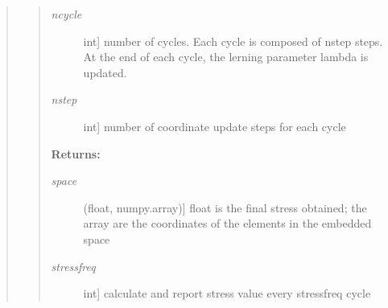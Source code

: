 \documentclass[letterpaper,10pt,english]{sphinxmanual}
\begin{document}
\begin{fulllineitems}
\begin{quote}
\begin{quote}
\begin{description}
\item[{\emph{ncycle}}] \leavevmode{[}int{]}
number of cycles. Each cycle is composed of nstep steps. At the end of each cycle, the lerning parameter lambda is updated.

\item[{\emph{nstep}}] \leavevmode{[}int{]}
number of coordinate update steps for each cycle

\end{description}

\textbf{Returns:}
\begin{description}
\item[{\emph{space}}] \leavevmode{[}(float, numpy.array){]}
float is the final stress obtained; the array are the coordinates of the elements in the embedded space

\item[{\emph{stressfreq}}] \leavevmode{[}int{]}
calculate and report stress value every stressfreq cycle

\end{description}
\end{quote}
\end{quote}

\end{fulllineitems}

\end{document}
